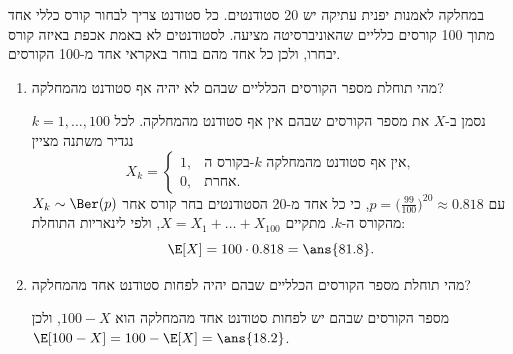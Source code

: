 במחלקה לאמנות יפנית עתיקה יש 20 סטודנטים. כל סטודנט צריך לבחור קורס כללי אחד מתוך 100 קורסים כלליים שהאוניברסיטה מציעה. לסטודנטים לא באמת אכפת באיזה קורס יבחרו, ולכן כל אחד מהם בוחר באקראי אחד מ-100 הקורסים.
\begin{enumerate}
\item מהי תוחלת מספר הקורסים הכלליים שבהם לא יהיה אף סטודנט מהמחלקה?
\begin{solbox}
\unverified
נסמן ב-$X$ את מספר הקורסים שבהם אין אף סטודנט מהמחלקה. לכל $k=1,\dots,100$ נגדיר משתנה מציין
\[
X_k=\begin{cases}1, & \text{בקורס ה-$k$ אין אף סטודנט מהמחלקה},\\ 0, & \text{אחרת}.\end{cases}
\]
$X_k\sim\Ber(p)$ עם $p=\big(\frac{99}{100}\big)^{20}\approx0.818$, כי כל אחד מ-20 הסטודנטים בחר קורס אחר מהקורס ה-$k$. מתקיים $X=X_1+\dots+X_{100}$, ולפי לינאריות התוחלת:
\[
\E[X]=100\cdot0.818=\ans{81.8}.
\]
\end{solbox}
\item מהי תוחלת מספר הקורסים הכלליים שבהם יהיה לפחות סטודנט אחד מהמחלקה?
\begin{solbox}
\unverified
מספר הקורסים שבהם יש לפחות סטודנט אחד מהמחלקה הוא $100-X$, ולכן $\E[100-X]=100-\E[X]=\ans{18.2}$.
\end{solbox}
\end{enumerate}
